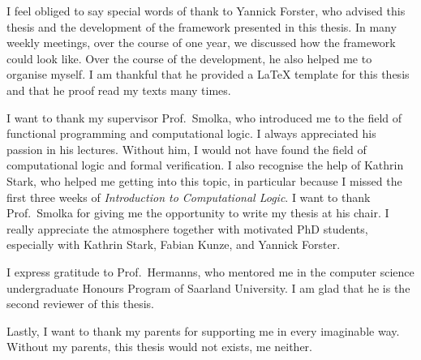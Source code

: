 I feel obliged to say special words of thank to Yannick Forster, who advised this thesis and the development of the framework presented in this
thesis.  In many weekly meetings, over the course of one year, we discussed how the framework could look like.  Over the course of the development, he
also helped me to organise myself.  I am thankful that he provided a {\LaTeX} template for this thesis and that he proof read my texts many times.

I want to thank my supervisor Prof.~Smolka, who introduced me to the field of functional programming and computational logic.  I always appreciated
his passion in his lectures.  Without him, I would not have found the field of computational logic and formal verification.  I also recognise the help
of Kathrin Stark, who helped me getting into this topic, in particular because I missed the first three weeks of \textit{Introduction to Computational
  Logic}.  I want to thank Prof.~Smolka for giving me the opportunity to write my thesis at his chair.  I really appreciate the atmosphere together
with motivated PhD students, especially with Kathrin Stark, Fabian Kunze, and Yannick Forster.

I express gratitude to Prof.~Hermanns, who mentored me in the computer science undergraduate Honours Program of Saarland University.  I am glad that
he is the second reviewer of this thesis.

Lastly, I want to thank my parents for supporting me in every imaginable way.  Without my parents, this thesis would not exists, me neither.



